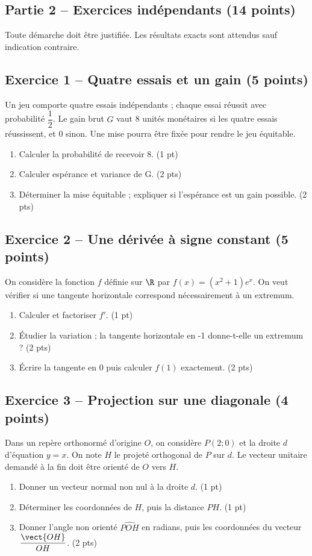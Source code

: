 \mxnewpage\subsection*{Partie 2 -- Exercices indépendants (14 points)}
Toute démarche doit être justifiée. Les résultats exacts sont attendus sauf indication contraire.
\subsection*{Exercice 1 -- Quatre essais et un gain (5 points)}
Un jeu comporte quatre essais indépendants ; chaque essai réussit avec probabilité $\dfrac12$. Le gain brut $G$ vaut 8 unités monétaires si les quatre essais réussissent, et 0 sinon. Une mise pourra être fixée pour rendre le jeu équitable.
\begin{enumerate}
\item Calculer la probabilité de recevoir 8. \hfill(1 pt)
\item Calculer espérance et variance de G. \hfill(2 pts)
\item Déterminer la mise équitable ; expliquer si l’espérance est un gain possible. \hfill(2 pts)
\end{enumerate}
\subsection*{Exercice 2 -- Une dérivée à signe constant (5 points)}
On considère la fonction $f$ définie sur $\R$ par $f(x)=(x^2+1)e^x$. On veut vérifier si une tangente horizontale correspond nécessairement à un extremum.
\begin{enumerate}
\item Calculer et factoriser $f\prime$. \hfill(1 pt)
\item Étudier la variation ; la tangente horizontale en -1 donne-t-elle un extremum ? \hfill(2 pts)
\item Écrire la tangente en 0 puis calculer $f(1)$ exactement. \hfill(2 pts)
\end{enumerate}
\subsection*{Exercice 3 -- Projection sur une diagonale (4 points)}
Dans un repère orthonormé d’origine $O$, on considère $P(2;0)$ et la droite $d$ d’équation $y=x$. On note $H$ le projeté orthogonal de $P$ sur $d$. Le vecteur unitaire demandé à la fin doit être orienté de $O$ vers $H$.
\begin{enumerate}
\item Donner un vecteur normal non nul à la droite $d$. \hfill(1 pt)
\item Déterminer les coordonnées de $H$, puis la distance $PH$. \hfill(1 pt)
\item Donner l’angle non orienté $\widehat{POH}$ en radians, puis les coordonnées du vecteur $\dfrac{\vect{OH}}{OH}$. \hfill(2 pts)
\end{enumerate}
